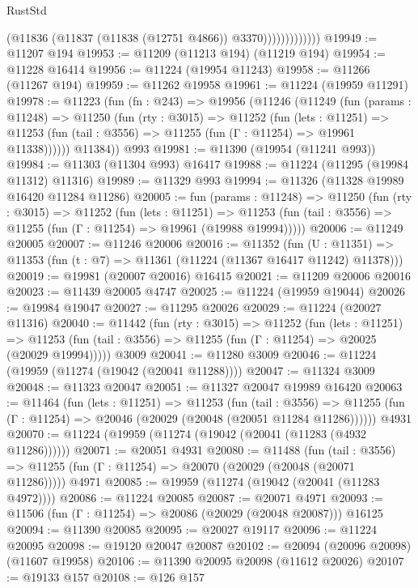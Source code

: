 \begin{lexlean}{RustStd}
\begin{coremodule}
                          (@11836 (@11837 (@11838 (@12751 @4866)) @3370)))))))))))))
@19949 := @11207 @194
@19953 := @11209 (@11213 @194) (@11219 @194)
@19954 := @11228 @16414
@19956 := @11224 (@19954 @11243)
@19958 := @11266 (@11267 @194)
@19959 := @11262 @19958
@19961 := @11224 (@19959 @11291)
@19978 := @11223
    (fun (fn : @243) =>
    @19956
      (@11246
        (@11249
          (fun (params : @11248) =>
          @11250
            (fun (rty : @3015) =>
            @11252
              (fun (lets : @11251) =>
              @11253 (fun (tail : @3556) => @11255 (fun (Γ : @11254) => @19961 @11338))))))
        @11384))
    @993
@19981 := @11390 (@19954 (@11241 @993))
@19984 := @11303 (@11304 @993) @16417
@19988 := @11224 (@11295 (@19984 @11312) @11316)
@19989 := @11329 @993
@19994 := @11326 (@11328 @19989 @16420 @11284 @11286)
@20005 := fun (params : @11248) =>
  @11250
    (fun (rty : @3015) =>
    @11252
      (fun (lets : @11251) =>
      @11253 (fun (tail : @3556) => @11255 (fun (Γ : @11254) => @19961 (@19988 @19994)))))
@20006 := @11249 @20005
@20007 := @11246 @20006
@20016 := @11352
    (fun (U : @11351) => @11353 (fun (t : @7) => @11361 (@11224 (@11367 @16417 @11242) @11378)))
@20019 := @19981 (@20007 @20016) @16415
@20021 := @11209 @20006 @20016
@20023 := @11439 @20005 @4747
@20025 := @11224 (@19959 @19044)
@20026 := @19984 @19047
@20027 := @11295 @20026
@20029 := @11224 (@20027 @11316)
@20040 := @11442
    (fun (rty : @3015) =>
    @11252
      (fun (lets : @11251) =>
      @11253 (fun (tail : @3556) => @11255 (fun (Γ : @11254) => @20025 (@20029 @19994)))))
    @3009
@20041 := @11280 @3009
@20046 := @11224 (@19959 (@11274 (@19042 (@20041 @11288))))
@20047 := @11324 @3009
@20048 := @11323 @20047
@20051 := @11327 @20047 @19989 @16420
@20063 := @11464
    (fun (lets : @11251) =>
    @11253
      (fun (tail : @3556) =>
      @11255 (fun (Γ : @11254) => @20046 (@20029 (@20048 (@20051 @11284 @11286))))))
    @4931
@20070 := @11224 (@19959 (@11274 (@19042 (@20041 (@11283 (@4932 @11286))))))
@20071 := @20051 @4931
@20080 := @11488
    (fun (tail : @3556) => @11255 (fun (Γ : @11254) => @20070 (@20029 (@20048 (@20071 @11286)))))
    @4971
@20085 := @19959 (@11274 (@19042 (@20041 (@11283 @4972))))
@20086 := @11224 @20085
@20087 := @20071 @4971
@20093 := @11506 (fun (Γ : @11254) => @20086 (@20029 (@20048 @20087))) @16125
@20094 := @11390 @20085
@20095 := @20027 @19117
@20096 := @11224 @20095
@20098 := @19120 @20047 @20087
@20102 := @20094 (@20096 @20098) (@11607 @19958)
@20106 := @11390 @20095 @20098 (@11612 @20026)
@20107 := @19133 @157
@20108 := @126 @157

\end{coremodule}
\end{lexlean}
